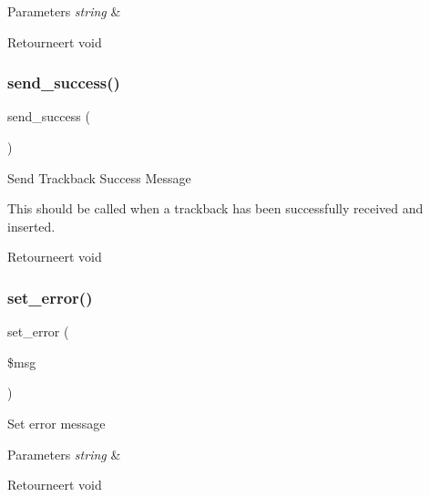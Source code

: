 \begin{DoxyParams}{Parameters}
{\em string} & \\
\hline
\end{DoxyParams}
\begin{DoxyReturn}{Retourneert}
void 
\end{DoxyReturn}
\mbox{\label{class_c_i___trackback_a57468453a4dc88340fdf12fb6e314248}} 
\subsubsection{\texorpdfstring{send\_success()}{send\_success()}}
{\footnotesize\ttfamily send\+\_\+success (\begin{DoxyParamCaption}{ }\end{DoxyParamCaption})}

Send Trackback Success Message

This should be called when a trackback has been successfully received and inserted.

\begin{DoxyReturn}{Retourneert}
void 
\end{DoxyReturn}
\mbox{\label{class_c_i___trackback_a892f1ba7cba3731a3fc68f1f64e92610}} 
\subsubsection{\texorpdfstring{set\_error()}{set\_error()}}
{\footnotesize\ttfamily set\+\_\+error (\begin{DoxyParamCaption}\item[{}]{\$msg }\end{DoxyParamCaption})}

Set error message


\begin{DoxyParams}{Parameters}
{\em string} & \\
\hline
\end{DoxyParams}
\begin{DoxyReturn}{Retourneert}
void 
\end{DoxyReturn}
\mbox{\label{class_c_i___trackback_a5caa264fab6d2b2344e6bd5b298b08f2}} 
